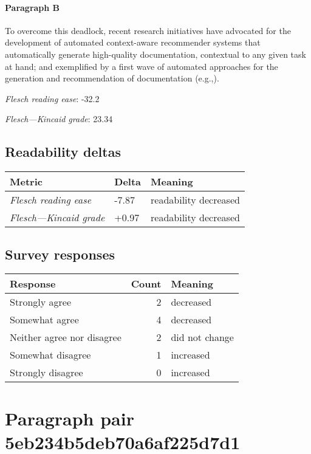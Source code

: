 \paragraph{Paragraph B}
To overcome this deadlock, recent research initiatives have advocated for the development of automated context-aware recommender systems that automatically generate high-quality documentation, contextual to any given task at hand; and exemplified by a first wave of automated approaches for the generation and recommendation of documentation (e.g.,).\par\medskip
\emph{Flesch reading ease}: -32.2\par
\emph{Flesch---Kincaid grade}: 23.34

\subsection{Readability deltas}

\begin{tabular}{lll}
\toprule
               \textbf{Metric} & \textbf{Delta} &       \textbf{Meaning} \\
\midrule
    \emph{Flesch reading ease} &          -7.87 &  readability decreased \\
 \emph{Flesch---Kincaid grade} &          +0.97 &  readability decreased \\
\bottomrule
\end{tabular}

\subsection{Survey responses}
\begin{tabular}{lrl}
\toprule
          \textbf{Response} &  \textbf{Count} & \textbf{Meaning} \\
\midrule
             Strongly agree &               2 &        decreased \\
             Somewhat agree &               4 &        decreased \\
 Neither agree nor disagree &               2 &   did not change \\
          Somewhat disagree &               1 &        increased \\
          Strongly disagree &               0 &        increased \\
\bottomrule
\end{tabular}

\section{Paragraph pair 5eb234b5deb70a6af225d7d1}
